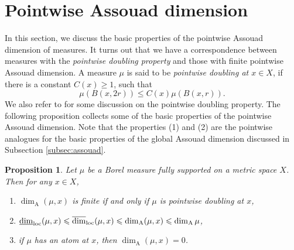 \documentclass{PRM}
\newcommand{\updim}{\overline{\dim}}
\newcommand{\lowdim}{\underline{\dim}}
\newcommand{\adim}{\dim_{\mathrm{A}}}
\theoremstyle{plain}
\newtheorem{prop}[thm]{Proposition}
\theoremstyle{definition}
\theoremstyle{remark}
\begin{document}
\section{Pointwise Assouad dimension}\label{sec:pw_assouad}
In this section, we discuss the basic properties of the pointwise Assouad dimension of measures. It turns out that we have a correspondence between measures with the \emph{pointwise doubling property} and those with finite pointwise Assouad dimension. A measure $\mu$ is said to be \emph{pointwise doubling at $x\in X$}, if there is a constant $C(x)\geq 1$, such that
\begin{equation*}
    \mu(B(x,2r))\leq C(x)\mu(B(x,r)).
\end{equation*}
We also refer to \cite{BBL} for some discussion on the pointwise doubling property.
The following proposition collects some of the basic properties of the pointwise Assouad dimension. Note that the properties (1) and (2) are the pointwise analogues for the basic properties of the global Assouad dimension discussed in Subsection \ref{subsec:assouad}.
\begin{prop}\label{prop:basic_properties}
Let $\mu$ be a Borel measure fully supported on a metric space $X$. Then for any $x\in X$,
\begin{enumerate}
    \item[(1)] $\dim_{\mathrm{A}}(\mu,x)$ is finite if and only if $\mu$ is pointwise doubling at $x$,
    \item[(2)] $\lowdim_{\textnormal{loc}}(\mu,x)\leq\updim_{\textnormal{loc}}(\mu,x)\leq \dim_{\mathrm{A}}(\mu,x)\leq \adim\mu$,
    \item[(3)] if $\mu$ has an atom at $x$, then $\dim_{\mathrm{A}}(\mu,x)=0$.
\end{enumerate}
\end{prop}
\end{document}
